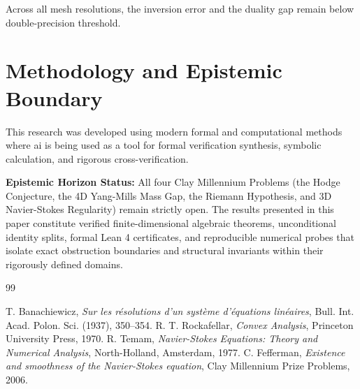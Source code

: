 \documentclass[11pt,a4paper]{article}
\theoremstyle{definition}
\begin{document}
\noindent Across all mesh resolutions, the inversion error and the duality gap remain below double-precision threshold.


\section{Methodology and Epistemic Boundary}
\noindent This research was developed using modern formal and computational methods where ai is being used as a tool for formal verification synthesis, symbolic calculation, and rigorous cross-verification.

\vspace{0.5em}
\noindent\textbf{Epistemic Horizon Status:} All four Clay Millennium Problems (the Hodge Conjecture, the 4D Yang-Mills Mass Gap, the Riemann Hypothesis, and 3D Navier-Stokes Regularity) remain strictly open. The results presented in this paper constitute verified finite-dimensional algebraic theorems, unconditional identity splits, formal Lean 4 certificates, and reproducible numerical probes that isolate exact obstruction boundaries and structural invariants within their rigorously defined domains.

\begin{thebibliography}{99}

 T. Banachiewicz, \emph{Sur les r\'esolutions d'un syst\`eme d'\'equations lin\'eaires}, Bull. Int. Acad. Polon. Sci. (1937), 350--354.
 R. T. Rockafellar, \emph{Convex Analysis}, Princeton University Press, 1970.
 R. Temam, \emph{Navier-Stokes Equations: Theory and Numerical Analysis}, North-Holland, Amsterdam, 1977.
 C. Fefferman, \emph{Existence and smoothness of the Navier-Stokes equation}, Clay Millennium Prize Problems, 2006.

\end{thebibliography}
\end{document}
